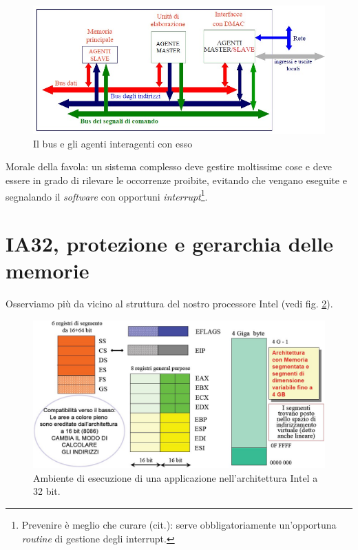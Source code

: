 \begin{figure}[!h]
\centering
\includegraphics[width=0.75\columnwidth]{img/busDintorni}
\caption{Il bus e gli agenti interagenti con esso}
\label{fig:busDintorni}
\end{figure}

Morale della favola: un sistema complesso deve gestire moltissime cose e deve essere in grado di rilevare le occorrenze proibite, evitando che vengano eseguite e segnalando il \textit{software} con opportuni \textit{interrupt}\footnote{Prevenire è meglio che curare (cit.): serve obbligatoriamente un'opportuna \textit{routine} di gestione degli interrupt.}.

\section{IA32, protezione e gerarchia delle memorie}
\label{sec:gerarchia_memorie}

Osserviamo più da vicino al struttura del nostro processore Intel (vedi fig. \ref{fig:ia32}).

\begin{figure}[!h]
\centering
\includegraphics[width=\columnwidth]{img/IA32}
\caption{Ambiente di esecuzione di una applicazione
nell'architettura Intel a 32 bit.}
\label{fig:ia32}
\end{figure}

